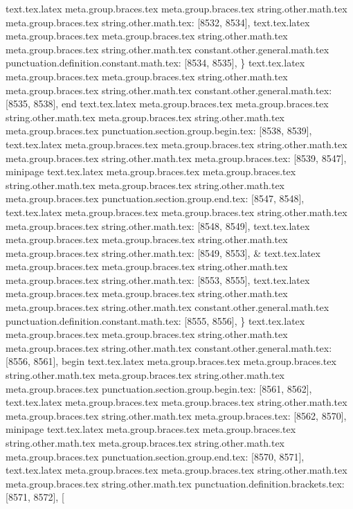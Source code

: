 {{{{{{{{{{{{{{{{{{{{{{{{{{{{{{{{{{{{{{{{{{{{{{{{{{{{{{{{{{{{{{{{{{{{{{{{{{{{{{{{{{{{{{{{{{{{{{{{{{{{{{{{{{{{{{{{{{{{{{{{{{{{{{{{{{{{{{{{{{{{{{{{{{{{{{{{{{{{{{{{{{{{{{{{{{{{{{{{{{{{{{{{{{{{{{{{{{{{{{{{{{{{{{{{{{{{{{{{{{{{{{{{{{{{{{{{{{{{{{{{{{{{{{{{{{{{}
text.tex.latex meta.group.braces.tex meta.group.braces.tex string.other.math.tex meta.group.braces.tex string.other.math.tex: [8532, 8534], {  }
text.tex.latex meta.group.braces.tex meta.group.braces.tex string.other.math.tex meta.group.braces.tex string.other.math.tex constant.other.general.math.tex punctuation.definition.constant.math.tex: [8534, 8535], {\}
text.tex.latex meta.group.braces.tex meta.group.braces.tex string.other.math.tex meta.group.braces.tex string.other.math.tex constant.other.general.math.tex: [8535, 8538], {end}
text.tex.latex meta.group.braces.tex meta.group.braces.tex string.other.math.tex meta.group.braces.tex string.other.math.tex meta.group.braces.tex punctuation.section.group.begin.tex: [8538, 8539], {{}
text.tex.latex meta.group.braces.tex meta.group.braces.tex string.other.math.tex meta.group.braces.tex string.other.math.tex meta.group.braces.tex: [8539, 8547], {minipage}
text.tex.latex meta.group.braces.tex meta.group.braces.tex string.other.math.tex meta.group.braces.tex string.other.math.tex meta.group.braces.tex punctuation.section.group.end.tex: [8547, 8548], {}}
text.tex.latex meta.group.braces.tex meta.group.braces.tex string.other.math.tex meta.group.braces.tex string.other.math.tex: [8548, 8549], {
}
text.tex.latex meta.group.braces.tex meta.group.braces.tex string.other.math.tex meta.group.braces.tex string.other.math.tex: [8549, 8553], {  &
}
text.tex.latex meta.group.braces.tex meta.group.braces.tex string.other.math.tex meta.group.braces.tex string.other.math.tex: [8553, 8555], {  }
text.tex.latex meta.group.braces.tex meta.group.braces.tex string.other.math.tex meta.group.braces.tex string.other.math.tex constant.other.general.math.tex punctuation.definition.constant.math.tex: [8555, 8556], {\}
text.tex.latex meta.group.braces.tex meta.group.braces.tex string.other.math.tex meta.group.braces.tex string.other.math.tex constant.other.general.math.tex: [8556, 8561], {begin}
text.tex.latex meta.group.braces.tex meta.group.braces.tex string.other.math.tex meta.group.braces.tex string.other.math.tex meta.group.braces.tex punctuation.section.group.begin.tex: [8561, 8562], {{}
text.tex.latex meta.group.braces.tex meta.group.braces.tex string.other.math.tex meta.group.braces.tex string.other.math.tex meta.group.braces.tex: [8562, 8570], {minipage}
text.tex.latex meta.group.braces.tex meta.group.braces.tex string.other.math.tex meta.group.braces.tex string.other.math.tex meta.group.braces.tex punctuation.section.group.end.tex: [8570, 8571], {}}
text.tex.latex meta.group.braces.tex meta.group.braces.tex string.other.math.tex meta.group.braces.tex string.other.math.tex punctuation.definition.brackets.tex: [8571, 8572], {[}
}}}}}}}}}}}}}}}}}}}}}}}}}}}}}}}}}}}}}}}}}}}}}}}}}}}}}}}}}}}}}}}}}}}}}}}}}}}}}}}}}}}}}}}}}}}}}}}}}}}}}}}}}}}}}}}}}}}}}}}}}}}}}}}}}}}}}}}}}}}}}}}}}}}}}}}}}}}}}}}}}}}}}}}}}}}}}}}}}}}}}}}}}}}}}}}}}}}}}}}}}}}}}}}}}}}}}}}}}}}}}}}}}}}}}}}}}}}}}}}}}}}}}}}}}}}}}
